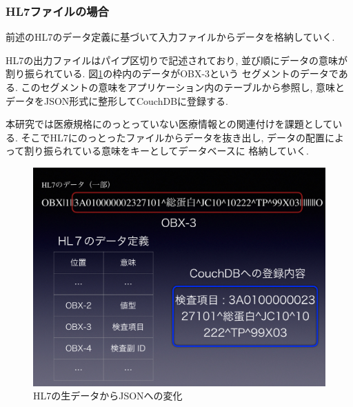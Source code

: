 		\subsubsection{HL7ファイルの場合}
			前述のHL7のデータ定義に基づいて入力ファイルからデータを格納していく.

			HL7の出力ファイルはパイプ区切りで記述されており,
			並び順にデータの意味が割り振られている.
			図\ref{hl7-data-trans}の枠内のデータがOBX-3という
			セグメントのデータである.
			このセグメントの意味をアプリケーション内のテーブルから参照し,
			意味とデータをJSON形式に整形してCouchDBに登録する.



			本研究では医療規格にのっとっていない医療情報との関連付けを課題としている.
			そこでHL7にのっとったファイルからデータを抜き出し,
			データの配置によって割り振られている意味をキーとしてデータベースに
			格納していく.

			\begin{figure}[htbp]
				\begin{center}
					\includegraphics[width=15cm, bb=0 0 1435 1073]{./gazou/hl7-data-trans2.png}
				\end{center}
				\caption{HL7の生データからJSONへの変化}
				\label{hl7-data-trans}
			\end{figure}

